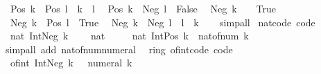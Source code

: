 \begin{isabellebody}
\ \ {\isachardoublequoteopen}Pos\ k\ {\isacharless}{\kern0pt}\ Pos\ l\ {\isasymlongleftrightarrow}\ k\ {\isacharless}{\kern0pt}\ l{\isachardoublequoteclose}\isanewline
\ \ {\isachardoublequoteopen}Pos\ k\ {\isacharless}{\kern0pt}\ Neg\ l\ {\isasymlongleftrightarrow}\ False{\isachardoublequoteclose}\isanewline
\ \ {\isachardoublequoteopen}Neg\ k\ {\isacharless}{\kern0pt}\ {}\ {\isasymlongleftrightarrow}\ True{\isachardoublequoteclose}\isanewline
\ \ {\isachardoublequoteopen}Neg\ k\ {\isacharless}{\kern0pt}\ Pos\ l\ {\isasymlongleftrightarrow}\ True{\isachardoublequoteclose}\isanewline
\ \ {\isachardoublequoteopen}Neg\ k\ {\isacharless}{\kern0pt}\ Neg\ l\ {\isasymlongleftrightarrow}\ l\ {\isacharless}{\kern0pt}\ k{\isachardoublequoteclose}\isanewline
%
\isadelimproof
\ \ %
\endisadelimproof
%
\isatagproof
{}\isamarkupfalse%
\ simp{\isacharunderscore}{\kern0pt}all%
\endisatagproof
{\isafoldproof}%
%
\isadelimproof
\isanewline
%
\endisadelimproof
\isanewline
{}\isamarkupfalse%
\ nat{\isacharunderscore}{\kern0pt}code\ {\isacharbrackleft}{\kern0pt}code{\isacharbrackright}{\kern0pt}{\isacharcolon}{\kern0pt}\isanewline
\ \ {\isachardoublequoteopen}nat\ {\isacharparenleft}{\kern0pt}Int{\isachardot}{\kern0pt}Neg\ k{\isacharparenright}{\kern0pt}\ {\isacharequal}{\kern0pt}\ {}{\isachardoublequoteclose}\isanewline
\ \ {\isachardoublequoteopen}nat\ {}\ {\isacharequal}{\kern0pt}\ {}{\isachardoublequoteclose}\isanewline
\ \ {\isachardoublequoteopen}nat\ {\isacharparenleft}{\kern0pt}Int{\isachardot}{\kern0pt}Pos\ k{\isacharparenright}{\kern0pt}\ {\isacharequal}{\kern0pt}\ nat{\isacharunderscore}{\kern0pt}of{\isacharunderscore}{\kern0pt}num\ k{\isachardoublequoteclose}\isanewline
%
\isadelimproof
\ \ %
\endisadelimproof
%
\isatagproof
{}\isamarkupfalse%
\ {\isacharparenleft}{\kern0pt}simp{\isacharunderscore}{\kern0pt}all\ add{\isacharcolon}{\kern0pt}\ nat{\isacharunderscore}{\kern0pt}of{\isacharunderscore}{\kern0pt}num{\isacharunderscore}{\kern0pt}numeral{\isacharparenright}{\kern0pt}%
\endisatagproof
{\isafoldproof}%
%
\isadelimproof
\isanewline
%
\endisadelimproof
\isanewline
{}\isamarkupfalse%
\ {\isacharparenleft}{\kern0pt}\ ring{\isacharunderscore}{\kern0pt}{}{\isacharparenright}{\kern0pt}\ of{\isacharunderscore}{\kern0pt}int{\isacharunderscore}{\kern0pt}code\ {\isacharbrackleft}{\kern0pt}code{\isacharbrackright}{\kern0pt}{\isacharcolon}{\kern0pt}\isanewline
\ \ {\isachardoublequoteopen}of{\isacharunderscore}{\kern0pt}int\ {\isacharparenleft}{\kern0pt}Int{\isachardot}{\kern0pt}Neg\ k{\isacharparenright}{\kern0pt}\ {\isacharequal}{\kern0pt}\ {\isacharminus}{\kern0pt}\ numeral\ k{\isachardoublequoteclose}\isanewline

\end{isabellebody}
